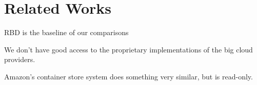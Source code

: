 \section{Related Works}

RBD is the baseline of our comparisons

We don't have good access to the proprietary implementations of the big cloud
providers.

Amazon's container store system does something very similar, but is read-only.
